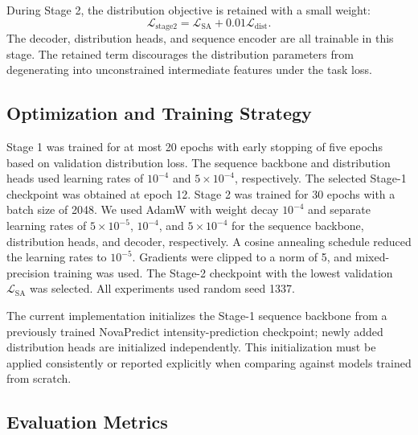 During Stage 2, the distribution objective is retained with a small weight:
\begin{equation}
    \mathcal{L}_{\mathrm{stage2}}
    = \mathcal{L}_{\mathrm{SA}}
      +0.01\mathcal{L}_{\mathrm{dist}}.
    \label{eq:stage2_loss}
\end{equation}
The decoder, distribution heads, and sequence encoder are all trainable in
this stage. The retained term discourages the distribution parameters from
degenerating into unconstrained intermediate features under the task loss.

\subsection{Optimization and Training Strategy}
\label{sec:optimization}

Stage 1 was trained for at most 20 epochs with early stopping of five epochs
based on validation distribution loss. The sequence backbone and distribution
heads used learning rates of $10^{-4}$ and $5\times10^{-4}$, respectively.
The selected Stage-1 checkpoint was obtained at epoch 12. Stage 2 was trained
for 30 epochs with a batch size of 2048. We used AdamW with weight decay
$10^{-4}$ and separate learning rates of $5\times10^{-5}$,
$10^{-4}$, and $5\times10^{-4}$ for the sequence backbone, distribution heads,
and decoder, respectively. A cosine annealing schedule reduced the learning
rates to $10^{-5}$. Gradients were clipped to a norm of 5, and mixed-precision
training was used. The Stage-2 checkpoint with the lowest validation
$\mathcal{L}_{\mathrm{SA}}$ was selected. All experiments used random seed
1337.

The current implementation initializes the Stage-1 sequence backbone from a
previously trained NovaPredict intensity-prediction checkpoint; newly added
distribution heads are initialized independently. This initialization must be
applied consistently or reported explicitly when comparing against models
trained from scratch.

\subsection{Evaluation Metrics}
\label{sec:evaluation_metrics}

